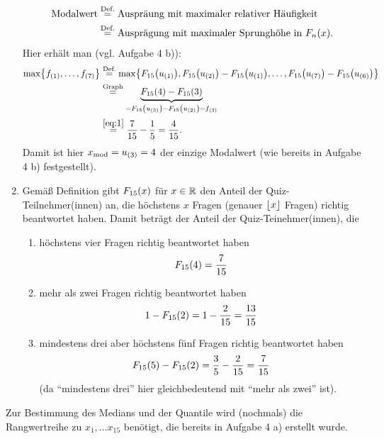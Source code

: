 \documentclass{exercise}
\begin{document}
\begin{enumerate}
\begin{align*}
            \text{Modalwert} &\stackrel{\text{Def.}}{=} \text{Auspräung mit maximaler relativer Häufigkeit}\\
            &\stackrel{\text{Def.}}{=} \text{Ausprägung mit maximaler Sprunghöhe in }F_n\parentheses*{x}.
        \end{align*}
        Hier erhält man (vgl. Aufgabe 4 b)):
        \begin{align*}
            \max\braces*{f_{\parentheses*{1}}, \ldots, f_{\parentheses*{7}}} &\stackrel{\text{Def.}}{=} \max\braces*{F_{15}\parentheses*{u_{\parentheses*{1}}}, F_{15}\parentheses*{u_{\parentheses*{2}}} - F_{15}\parentheses*{u_{\parentheses*{1}}}, \ldots, F_{15}\parentheses*{u_{\parentheses*{7}}} - F_{15}\parentheses*{u_{\parentheses*{6}}}}\\
            &\stackrel{\text{Graph}}{=} \underbrace{F_{15}\parentheses*{4} - F_{15}\parentheses*{3}}_{= F_{15}\parentheses*{u_{\parentheses*{3}}} - F_{15}\parentheses*{u_{\parentheses*{2}}} = f_{\parentheses*{3}}}\\
            &\stackrel{\eqref{eq:1}}{=} \frac{7}{15} - \frac{1}{5} = \frac{4}{15}.
        \end{align*}
        Damit ist hier \(x_{\text{mod}} = u_{\parentheses*{3}} = 4\) der einzige Modalwert (wie bereits in Aufgabe 4 b) festgestellt).
        \item Gemäß Definition gibt \(F_{15}\parentheses*{x}\) für \(x \in \R\) den Anteil der Quiz-Teilnehmer(innen) an, die höchstens \(x\) Fragen (genauer \(\floor*{x}\) Fragen) richtig beantwortet haben.
        Damit beträgt der Anteil der Quiz-Teinehmer(innen), die
        \begin{enumerate}
            \item höchstens vier Fragen richtig beantwortet haben
            \[
                F_{15}\parentheses*{4} = \frac{7}{15}
            \]
            \item mehr als zwei Fragen richtig beantwortet haben
            \[
                1 - F_{15}\parentheses*{2} = 1 - \frac{2}{15} = \frac{13}{15}
            \]
            \item mindestens drei aber höchstens fünf Fragen richtig beantwortet haben
            \[
                F_{15}\parentheses*{5} - F_{15}\parentheses*{2} = \frac{3}{5} - \frac{2}{15} = \frac{7}{15}
            \]
            (da ``mindestens drei'' hier gleichbedeutend mit ``mehr als zwei'' ist).
        \end{enumerate}
    \end{enumerate}
    Zur Bestimmung des Medians und der Quantile wird (nochmals) die Rangwertreihe zu \(x_1, \ldots x_{15}\) benötigt, die bereits in Aufgabe 4 a) erstellt wurde.
\end{document}
